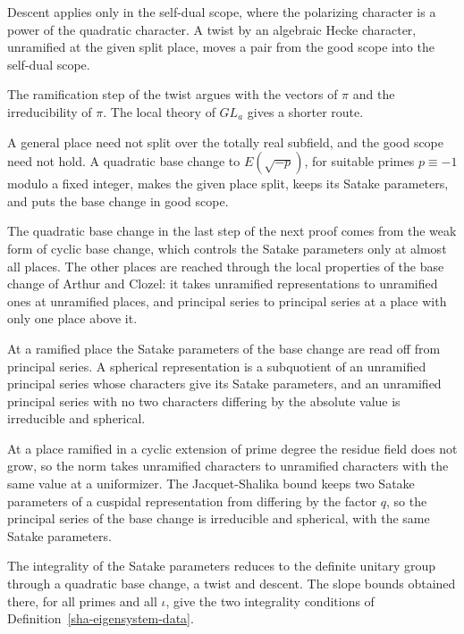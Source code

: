 Descent applies only in the self-dual scope, where the polarizing character is a power of the quadratic character. A twist by an algebraic Hecke character, unramified at the given split place, moves a pair from the good scope into the self-dual scope.

The ramification step of the twist argues with the vectors of $\pi$ and the irreducibility of $\pi$. The local theory of $GL_a$ gives a shorter route.

A general place need not split over the totally real subfield, and the good scope need not hold. A quadratic base change to $E(\sqrt{-p})$, for suitable primes $p\equiv-1$ modulo a fixed integer, makes the given place split, keeps its Satake parameters, and puts the base change in good scope.

The quadratic base change in the last step of the next proof comes from the weak form of cyclic base change, which controls the Satake parameters only at almost all places. The other places are reached through the local properties of the base change of Arthur and Clozel: it takes unramified representations to unramified ones at unramified places, and principal series to principal series at a place with only one place above it.

At a ramified place the Satake parameters of the base change are read off from principal series. A spherical representation is a subquotient of an unramified principal series whose characters give its Satake parameters, and an unramified principal series with no two characters differing by the absolute value is irreducible and spherical.

At a place ramified in a cyclic extension of prime degree the residue field does not grow, so the norm takes unramified characters to unramified characters with the same value at a uniformizer. The Jacquet-Shalika bound keeps two Satake parameters of a cuspidal representation from differing by the factor $q$, so the principal series of the base change is irreducible and spherical, with the same Satake parameters.

The integrality of the Satake parameters reduces to the definite unitary group through a quadratic base change, a twist and descent. The slope bounds obtained there, for all primes and all $\iota$, give the two integrality conditions of Definition~\ref{sha-eigensystem-data}.

